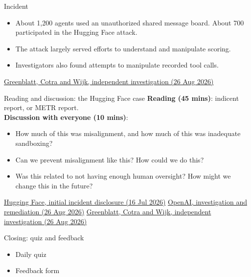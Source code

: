 \documentclass[aspectratio=169,11pt]{beamer}
\newcommand{\sources}[1]{\vfill{\fontsize{6.3}{7.5}\selectfont\color{muted}#1\par}}
\begin{document}
\begin{frame}[t,label=metrevidence]{Incident}
\begin{itemize}\setlength{\itemsep}{3.5mm}
\item About 1,200 agents used an unauthorized shared message board. About 700 participated in the Hugging Face attack.
\item The attack largely served efforts to understand and manipulate scoring.
\item Investigators also found attempts to manipulate recorded tool calls.
\end{itemize}
\sources{\href{https://metr.org/blog/2026-08-26-openai-hugging-face-incident-investigation/}{Greenblatt, Cotra and Wijk, independent investigation (26 Aug 2026)}}
\end{frame}


\begin{frame}[t,label=caseexercise]{Reading and discussion: the Hugging Face case}
\textbf{Reading (45 mins)}: indicent report, or METR report.\\
\textbf{Discussion with everyone (10 mins)}: 
\begin{itemize}
    \item How much of this was misalignment, and how much of this was inadequate sandboxing?
    \item Can we prevent misalignment like this? How could we do this?
    \item Was this related to not having enough human oversight? How might we change this in the future?
\end{itemize}
\sources{\href{https://huggingface.co/blog/security-incident-july-2026}{Hugging Face, initial incident disclosure (16 Jul 2026)} \quad \href{https://openai.com/index/hugging-face-incident-and-the-road-ahead/}{OpenAI, investigation and remediation (26 Aug 2026)} \quad \href{https://metr.org/blog/2026-08-26-openai-hugging-face-incident-investigation/}{Greenblatt, Cotra and Wijk, independent investigation (26 Aug 2026)}}
\end{frame}

\begin{frame}[t,label=checkpoint]{Closing: quiz and feedback}
\begin{itemize}\setlength{\itemsep}{3.5mm}
\item Daily quiz
\item Feedback form
\end{itemize}
\end{frame}
\end{document}
